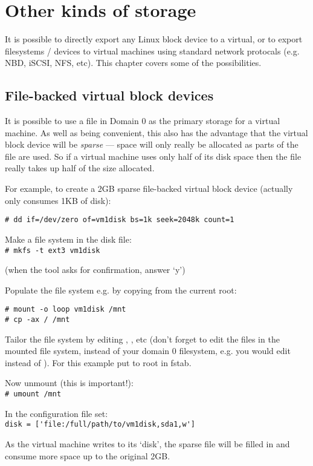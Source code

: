 \documentclass[11pt,twoside,final,openright]{xenstyle}
\begin{document}
\chapter{Other kinds of storage}

It is possible to directly export any Linux block device to a virtual,
or to export filesystems / devices to virtual machines using standard
network protocals (e.g. NBD, iSCSI, NFS, etc).  This chapter covers
some of the possibilities.

\section{File-backed virtual block devices}

It is possible to use a file in Domain 0 as the primary storage for a
virtual machine.  As well as being convenient, this also has the
advantage that the virtual block device will be {\em sparse} --- space
will only really be allocated as parts of the file are used.  So if a
virtual machine uses only half of its disk space then the file really
takes up half of the size allocated.

For example, to create a 2GB sparse file-backed virtual block device
(actually only consumes 1KB of disk):

\verb_# dd if=/dev/zero of=vm1disk bs=1k seek=2048k count=1_

Make a file system in the disk file: \\
\verb_# mkfs -t ext3 vm1disk_

(when the tool asks for confirmation, answer `y')

Populate the file system e.g. by copying from the current root:
\begin{verbatim}
# mount -o loop vm1disk /mnt
# cp -ax / /mnt
\end{verbatim}
Tailor the file system by editing ,
, etc (don't forget to edit the files in the
mounted file system, instead of your domain 0 filesystem, e.g. you
would edit  instead of  ).  For
this example put  to root in fstab.

Now unmount (this is important!):\\
\verb_# umount /mnt_

In the configuration file set:\\
\verb_disk = ['file:/full/path/to/vm1disk,sda1,w']_

As the virtual machine writes to its `disk', the sparse file will be
filled in and consume more space up to the original 2GB.
\end{document}
